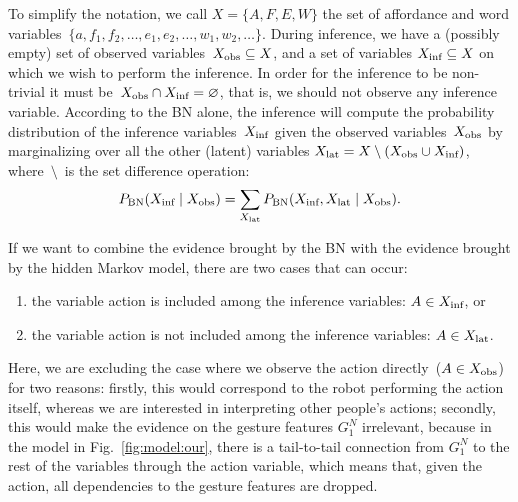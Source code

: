 To simplify the notation, we call $X = \{A, F, E, W\}$ the set of affordance and word variables~$\{a, f_1, f_2, \dots, e_1, e_2, \dots, w_1, w_2, \dots\}$.
During inference, we have a (possibly empty) set of observed variables~$X_\text{obs} \subseteq X$, and a set of variables $X_\text{inf} \subseteq X$ on which we wish to perform the inference.
In order for the inference to be non-trivial it must be~$X_\text{obs} \cap X_\text{inf} = \varnothing$, that is, we should not observe any inference variable.
According to the \ac{BN} alone, the inference will compute the probability distribution of the inference variables~$X_\text{inf}$ given the observed variables~$X_\text{obs}$ by marginalizing over all the other (latent) variables $X_\text{lat} = X \setminus (X_\text{obs} \cup X_\text{inf})$, where~$\setminus$~is the set difference operation:
\begin{eqnarray*}
 P_{\text{BN}}(X_\text{inf} \mid X_\text{obs}) = \sum_{X_\text{lat}} P_{\text{BN}}(X_\text{inf}, X_\text{lat} \mid X_\text{obs}).
\end{eqnarray*}

If we want to combine the evidence brought by the \ac{BN} with the evidence brought by the hidden Markov model, there are two cases that can occur:
\begin{enumerate}
\item the variable action is included among the inference variables: $A \in X_\text{inf}$, or

\item the variable action is not included among the inference variables: $A \in X_\text{lat}$.
\end{enumerate}

Here, we are excluding the case where we observe the action directly~($A\in X_\text{obs}$) for two reasons: firstly, this would correspond to the robot performing the action itself, whereas we are interested in interpreting other people's actions;
secondly, this would make the evidence on the gesture features $G_1^N$ irrelevant, because in the model in Fig.~\ref{fig:model:our}, there is a tail-to-tail connection from $G_1^N$ to the rest of the variables through the action variable, which means that, given the action, all dependencies to the gesture features are dropped.

